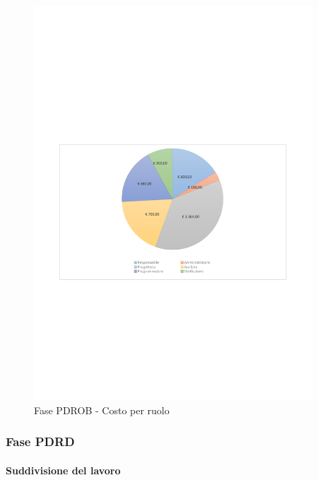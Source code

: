 \documentclass[../PianoProgetto.tex]{subfiles}
\begin{document}
\vfill	
	\begin{figure}[H]
		\centering
		\includegraphics[width=0.93\textwidth , trim=1.5cm 9cm 1.5cm 9cm]{grafici/PDROB/PDROB-costo}
			\caption{Fase PDROB - Costo per ruolo}
		\label{fig:CircleChart-fasePDROB_costo}
	\end{figure}
\vfill	
\newpage	
	
	\subsubsection{Fase PDRD}
				\paragraph{Suddivisione del lavoro}\
						
\end{document}
